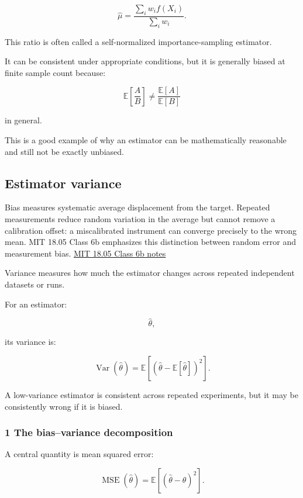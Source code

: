\[
 \widehat\mu= \frac{ \sum_iw_i f(X_i) }{ \sum_iw_i }.
\]

This ratio is often called a self-normalized importance-sampling estimator.

It can be consistent under appropriate conditions, but it is generally biased at finite sample count because:

\[
 \mathbb E\left[\frac AB\right] \ne \frac{\mathbb E[A]}{\mathbb E[B]}
\]

in general.

This is a good example of why an estimator can be mathematically reasonable and still not be exactly unbiased.

\subsection{Estimator variance}\label{02-foundations-ii-ch030-estimator-variance}

Bias measures systematic average displacement from the target. Repeated measurements reduce random variation in the average but cannot remove a calibration offset: a miscalibrated instrument can converge precisely to the wrong mean. MIT 18.05 Class 6b emphasizes this distinction between random error and measurement bias. \href{https://ocw.mit.edu/courses/18-05-introduction-to-probability-and-statistics-spring-2022/mit18_05_s22_classC0-prep-b.pdf}{MIT 18.05 Class 6b notes}

Variance measures how much the estimator changes across repeated independent datasets or runs.

For an estimator:

\[
 \widehat\theta,
\]

its variance is:

\[
 \boxed{ \operatorname{Var}(\widehat\theta) = \mathbb E[ (\widehat\theta-\mathbb E[\widehat\theta])^2 ] }.
\]

A low-variance estimator is consistent across repeated experiments, but it may be consistently wrong if it is biased.

\subsubsection{1 The bias--variance decomposition}\label{02-foundations-ii-ch030-the-biasvariance-decomposition}

A central quantity is mean squared error:

\[
 \operatorname{MSE}(\widehat\theta) = \mathbb E[(\widehat\theta-\theta)^2].
\]

